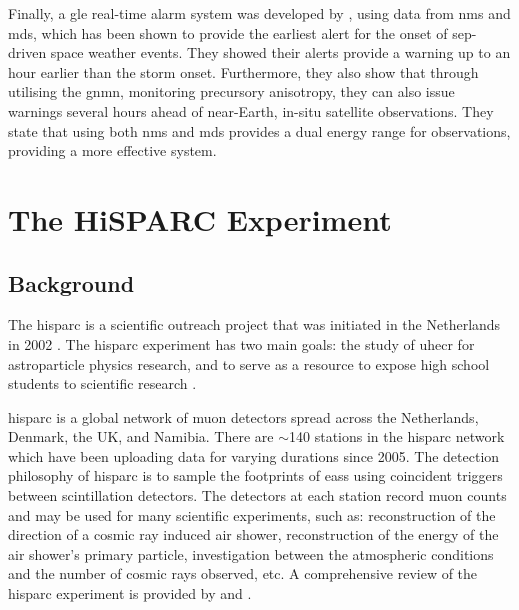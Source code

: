 Finally, a \gls{gle} real-time alarm system was developed by \citet{kuwabara_real-time_2006, kuwabara_development_2006}, using data from \glspl{nm} and \glspl{md}, which has been shown to provide the earliest alert for the onset of \gls{sep}-driven space weather events. They showed their alerts provide a warning up to an hour earlier than the storm onset. Furthermore, they also show that through utilising the \gls{gnmn}, monitoring precursory anisotropy, they can also issue warnings several hours ahead of near-Earth, in-situ satellite observations. They state that using both \glspl{nm} and \glspl{md} provides a dual energy range for observations, providing a more effective system.


\glsresetall 
{}
\section{The HiSPARC Experiment}\label{sec:intro_HiSPARC}

\subsection{Background}

The \gls{hisparc} is a scientific outreach project that was initiated in the Netherlands in 2002 \citep{bartels_hisparc_2012}. The \gls{hisparc} experiment has two main goals: the study of \gls{uhecr} for astroparticle physics research, and to serve as a resource to expose high school students to scientific research \citep{bartels_hisparc_2012}.

\gls{hisparc} is a global network of muon detectors spread across the Netherlands, Denmark, the UK, and Namibia. There are $\sim$140 stations in the \gls{hisparc} network \citep{van_dam_hisparc_2020} which have been uploading data for varying durations since 2005. The detection philosophy of \gls{hisparc} is to sample the footprints of \glspl{eas} using coincident triggers between scintillation detectors. The detectors at each station record muon counts and may be used for many scientific experiments, such as: reconstruction of the direction of a cosmic ray induced air shower, reconstruction of the energy of the air shower's primary particle, investigation between the atmospheric conditions and the number of cosmic rays observed, etc. A comprehensive review of the \gls{hisparc} experiment is provided by \citet{fokkema_hisparc_2012} and \citet{van_dam_hisparc_2020}.

